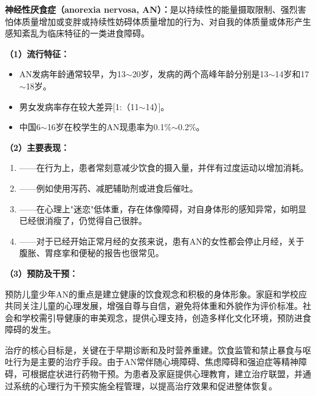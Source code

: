 \begin{keybox}
\textbf{神经性厌食症（anorexia nervosa, AN）：}是以持续性的能量摄取限制、强烈害怕体质量增加或变胖或持续性妨碍体质量增加的行为、对自我的体质量或体形产生感知紊乱为临床特征的一类进食障碍。

\vspace{4pt}
\textbf{（1）流行特征：}

\begin{itemize}[leftmargin=*]
    \item AN发病年龄通常较早，为13$\sim$20岁，发病的两个高峰年龄分别是13$\sim$14岁和17$\sim$18岁。
    \item 男女发病率存在较大差异[1:（11$\sim$14）]。
    \item 中国6$\sim$16岁在校学生的AN现患率为0.1\%$\sim$0.2\%。
\end{itemize}

\vspace{4pt}
\textbf{（2）主要表现：}

\begin{enumerate}[leftmargin=*]
    \item {}——在行为上，患者常刻意减少饮食的摄入量，并伴有过度运动以增加消耗。
    \item {}——例如使用泻药、减肥辅助剂或进食后催吐。
    \item {}——在心理上"迷恋"低体重，存在体像障碍，对自身体形的感知异常，如明显已经很消瘦了，仍觉得自己很胖。
    \item {}——对于已经开始正常月经的女孩来说，患有AN的女性都会停止月经，关于腹胀、胃痉挛和便秘的报告也很常见。
\end{enumerate}

\vspace{4pt}
\textbf{（3）预防及干预：}

预防儿童少年AN的重点是建立健康的饮食观念和积极的身体形象。家庭和学校应共同关注儿童的心理发展，增强自尊与自信，避免将体重和外貌作为评价标准。社会和学校需引导健康的审美观念，提供心理支持，创造多样化文化环境，预防进食障碍的发生。

治疗的核心目标是，关键在于早期诊断和及时营养重建。饮食监管和禁止暴食与呕吐行为是主要的治疗手段。由于AN常伴随心境障碍、焦虑障碍和强迫症等精神障碍，可根据症状进行药物干预。为患者及家庭提供心理教育，建立治疗联盟，并通过系统的心理行为干预实施全程管理，以提高治疗效果和促进整体恢复。
\end{keybox}

\newpage
